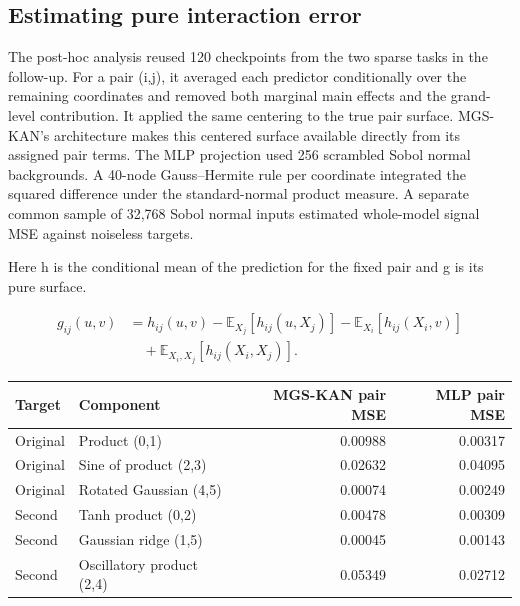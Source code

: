 \documentclass[11pt]{article}
\numberwithin{equation}{section}
\begin{document}
\subsection{Estimating pure interaction error}

The post-hoc analysis reused 120 checkpoints from the two sparse tasks in the follow-up. For a
pair (i,j), it averaged each predictor conditionally over the remaining coordinates and
removed both marginal main effects and the grand-level contribution. It applied the same
centering to the true pair surface. MGS-KAN's architecture makes this centered surface
available directly from its assigned pair terms. The MLP projection used 256 scrambled Sobol
normal backgrounds. A 40-node Gauss--Hermite rule per coordinate integrated the squared
difference under the standard-normal product measure. A separate common sample of 32,768 Sobol
normal inputs estimated whole-model signal MSE against noiseless targets.

Here h is the conditional mean of the prediction for the fixed pair and g is its pure surface.

\begin{equation}
\begin{aligned}
g_{ij}(u,v)
 &=h_{ij}(u,v)
   -\mathbb E_{X_j}[h_{ij}(u,X_j)]
   -\mathbb E_{X_i}[h_{ij}(X_i,v)]\\
 &\quad+\mathbb E_{X_i,X_j}[h_{ij}(X_i,X_j)].
\end{aligned}
\label{eq:report-pair-projection}
\end{equation}

\begin{center}
\small
\begin{tabularx}{\linewidth}{@{} l Y r r @{}}
\toprule
\textbf{Target} & \textbf{Component} & \textbf{MGS-KAN pair MSE} & \textbf{MLP pair MSE} \\
\midrule
Original & Product (0,1) & 0.00988 & 0.00317 \\
Original & Sine of product (2,3) & 0.02632 & 0.04095 \\
Original & Rotated Gaussian (4,5) & 0.00074 & 0.00249 \\
Second & Tanh product (0,2) & 0.00478 & 0.00309 \\
Second & Gaussian ridge (1,5) & 0.00045 & 0.00143 \\
Second & Oscillatory product (2,4) & 0.05349 & 0.02712 \\
\bottomrule
\end{tabularx}
\end{center}
\end{document}
